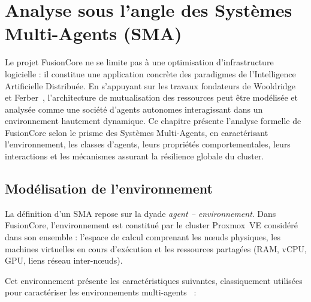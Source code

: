 \chapter{Analyse sous l'angle des Systèmes Multi-Agents (SMA)}
\label{ch:sma}

Le projet FusionCore ne se limite pas à une optimisation d'infrastructure logicielle : il constitue une application concrète des paradigmes de l'Intelligence Artificielle Distribuée. En s'appuyant sur les travaux fondateurs de Wooldridge~\cite{wooldridge_2002_sma} et Ferber~\cite{ferber_1995_sma}, l'architecture de mutualisation des ressources peut être modélisée et analysée comme une société d'agents autonomes interagissant dans un environnement hautement dynamique. Ce chapitre présente l'analyse formelle de FusionCore selon le prisme des Systèmes Multi-Agents, en caractérisant l'environnement, les classes d'agents, leurs propriétés comportementales, leurs interactions et les mécanismes assurant la résilience globale du cluster.

\section{Modélisation de l'environnement}
\label{sec:sma-environnement}

La définition d'un SMA repose sur la dyade \emph{agent -- environnement}. Dans FusionCore, l'environnement est constitué par le cluster Proxmox~VE considéré dans son ensemble : l'espace de calcul comprenant les nœuds physiques, les machines virtuelles en cours d'exécution et les ressources partagées (RAM, vCPU, GPU, liens réseau inter-nœuds).

Cet environnement présente les caractéristiques suivantes, classiquement utilisées pour caractériser les environnements multi-agents~\cite{wooldridge_2002_sma} :

